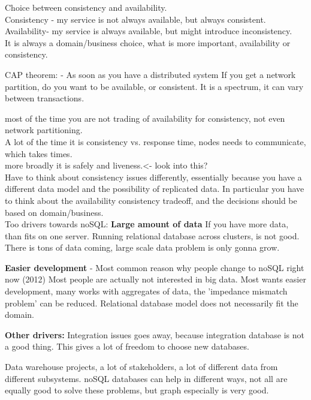 {Choice between consistency and availability.\\
Consistency - my service is not always available, but always consistent.\\
Availability- my service is always available, but might introduce inconsistency.\\
It is always a domain/business choice, what is more important, availability or consistency.

CAP theorem: - As soon as you have a distributed system
If you get a network partition, do you want to be available, or consistent.
It is a spectrum, it can vary between transactions.

most of the time you are not trading of availability for consistency, not even network partitioning.\\
A lot of the time it is consistency vs. response time, nodes needs to communicate, which takes times.\\
more broadly it is safely and liveness.<- look into this? \\

Have to think about consistency issues differently, essentially because you have a different data model and the possibility of replicated data. In particular you have to think about the availability consistency tradeoff, and the decisions should be based on domain/business.\\

Too drivers towards noSQL:
\textbf{Large amount of data}
If you have more data, than fits on one server. Running relational database across clusters, is not good.\\
There is tons of data coming, large scale data problem is only gonna grow. 

\textbf{Easier development} - Most common reason why people change to noSQL right now (2012)
Most people are actually not interested in big data.
Most wants easier development, many works with aggregates of data, the 'impedance mismatch problem' can be reduced. Relational database model does not necessarily fit the domain.

\textbf{Other drivers:}
Integration issues goes away, because integration database is not a good thing. This gives a lot of freedom to choose new databases.

Data warehouse projects, a lot of stakeholders, a lot of different data from different subsystems. noSQL databases can help in different ways, not all are equally good to solve these problems, but graph especially is very good.

}
